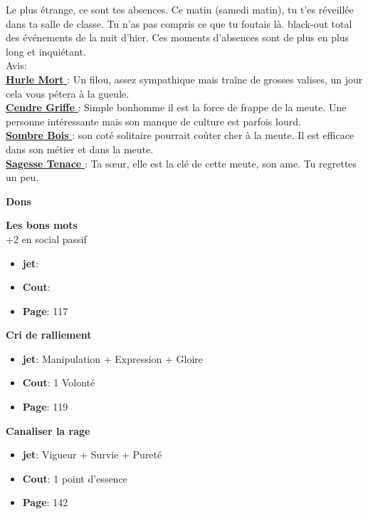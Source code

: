 \documentclass[oneside,12pt]{book}
\newcommand\don[5]{
\textbf{#1} \\
#2
\begin{itemize}
\item{ \textbf{jet}: #3}
\item{ \textbf{Cout}: #4}
\item{ \textbf{Page}: #5}
\end{itemize}
\vspace{0.5cm}
}
\newcommand{\Jessica}{\textbf{Sagesse Tenace} }
\newcommand{\Luke}{\textbf{Cendre Griffe} }
\newcommand{\Peter}{\textbf{Hurle Mort} }
\newcommand{\Leonard}{\textbf{Sombre Bois} }
\begin{document}
\begin{flushleft}
\begin{description}
{Le plus étrange, ce sont tes absences. Ce matin (samedi matin), tu t'es réveillée dans ta salle de classe. Tu n'as pas compris ce que tu foutais là. black-out total des événements de la nuit d'hier. Ces moments d'absences sont de plus en plus long et inquiétant. \\
Avis:\\
\underline{\Peter} : Un filou, assez sympathique mais traîne de grosses valises, un jour cela vous pétera à la gueule.\\
\underline{\Luke} : Simple bonhomme il est la force de frappe de la meute. Une personne intéressante mais son manque de culture est parfois lourd.\\
\underline{\Leonard} : son coté solitaire pourrait coûter cher à la meute. Il est efficace dans son métier et dans la meute.\\
\underline{\Jessica}: Ta sœur, elle est la clé de cette meute, son ame. Tu regrettes un peu.\\
}
\end{description}
\clearpage
\textbf{\large Dons} 
\vspace{0.5cm}

\don{Les bons mots}{+2 en social passif}{}{}{117}
\don{Cri de ralliement}{}{Manipulation + Expression + Gloire}{1 Volonté}{119}
\don{Canaliser la rage}{}{Vigueur + Survie + Pureté}{1 point d'essence}{142}

\clearpage

\end{flushleft}
\end{document}
